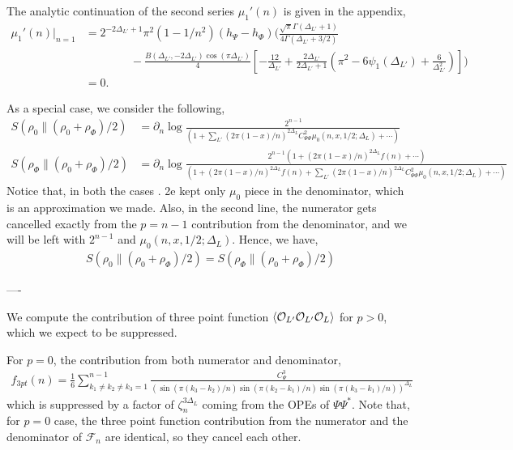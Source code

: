 \documentclass[11pt]{article}
\newcommand{\p}{\partial}
\newcommand{\mO}{\mathcal{O}}
\newcommand{\nn}{\nonumber}
\newcommand{\lb}{\left(}
\newcommand{\rb}{\right)}
\begin{document}
The analytic continuation of the second series $\mu_1'(n)$ is given in the appendix,
\begin{align}
    \mu_1'(n)\big|_{n=1} &= 2^{-2\Delta_{L'}+1}\pi^2(1-1/n^2)(h_\Psi - h_\Phi) \Bigg(\frac{\sqrt{\pi}\Gamma(\Delta_{L'}+1)}{4\Gamma(\Delta_{L'}+3/2)} \nn  \\
    &\qquad\qquad
    -\frac{ B(\Delta_{L'},-2\Delta_{L'})\cos(\pi \Delta_{L'})}{4}\left[ -\frac{12}{\Delta_{L'}} + \frac{2\Delta_{L'} }{2\Delta_{L'} + 1} \lb \pi^2 -6\psi_1(\Delta_{L'}) + \frac{6}{\Delta_{L'}^2} \rb  \right]
    \Bigg) \\
    & = 0.
\end{align}


As a special case, we consider the following,
\begin{align}
    S(\rho_0 \| (\rho_0 + \rho_\Phi)/2) &= \p_n \log \frac{\,2^{n-1}}{\displaystyle \lb 1+\sum_{L'}\lb 2\pi (1-x)/n\rb ^{2\Delta_{L}} C_{\Psi\Phi}^2\mu_0(n,x,1/2;\Delta_{L})+\cdots\rb}\\
    S(\rho_\Phi \| (\rho_0 + \rho_\Phi)/2)&= \p_n \log \frac{\,2^{n-1}\lb 1+(2\pi (1-x)/n)^{2\Delta_L}f(n)+\cdots\rb}{\displaystyle \lb 1+(2\pi (1-x)/n)^{2\Delta_L}f(n)+\sum_{L'}\lb 2\pi (1-x)/n\rb ^{2\Delta_{L}} C_{\Psi\Phi}^2\mu_0(n,x,1/2;\Delta_{L})+\cdots\rb}
\end{align}
Notice that, in both the cases . 2e kept only $\mu_0$ piece in the denominator, which is an approximation we made. Also, in the second line, the numerator gets cancelled exactly from the $p=n-1$ contribution from the denominator, and we will be left with $2^{n-1}$ and $\mu_0(n,x,1/2;\Delta_{L})$. Hence, we have, 
\begin{align}
     S(\rho_0 \| (\rho_0 + \rho_\Phi)/2) = S(\rho_\Phi \| (\rho_0 + \rho_\Phi)/2)
\end{align}

----

We compute the contribution of three point function $\braket{\mO_{L'} \mO_{L'}\mO_L}$ for $p>0$, which we expect to be suppressed.

For $p=0$, the contribution from both numerator and denominator,
\begin{align}
    f_{3pt}(n) = \frac{1}{6}\sum_{k_1\neq k_2\neq k_3 =1}^{n-1} \frac{C_{\Psi}^3 }{\lb \sin(\pi (k_3 - k_2)/n) \sin (\pi (k_2 - k_1)/n) \sin(\pi (k_3-k_1)/n)\rb^{\Delta_L}}
\end{align}
which is suppressed by a factor of $\zeta_n^{3\Delta_L}$ coming from the OPEs of $\Psi \Psi^*$.
Note that, for $p=0$ case, the three point function contribution from the numerator and the denominator of $\mathcal{F}_n$ are identical, so they cancel each other.
\end{document}
